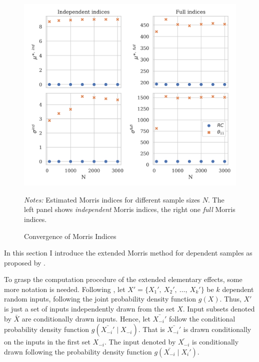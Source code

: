 \begin{figure}[t]
	\caption{Convergence of Morris Indices}
    \label{morris_convergence}
    \begin{centering}
	\vspace*{-4mm}
	\begin{centering}
	\includegraphics[scale=0.9]{../figures/morris_convergence.png}
    \end{centering}
    \end{centering}

    \small
    \textit{Notes:} Estimated Morris indices for different sample sizes $N$. The left panel shows \textit{independent} Morris indices, the right one \textit{full} Morris indices.
\end{figure}

In this section I introduce the extended Morris method for dependent samples as proposed by \citet{GM17}.

To grasp the computation procedure of the extended elementary effects, some more notation is needed. Following \citet{GM17}, let $X' = \{X_1',\ X_2',\ \dots,\ X_k'\}$ be $k$ dependent random inputs, following the joint probability density function $g(X)$. Thus, $X'$ is just a set of inputs independently drawn from the set $X$. Input subsets denoted by $\bar{X}$ are conditionally drawn inputs. Hence, let $\bar{X_{-i}'}$ follow the conditional probability density function $g(\bar{X_{-i}'} \mid X_{-i})$. That is $\bar{X_{-i}'}$ is drawn conditionally on the inputs in the first set $X_{-i}$. The input denoted by $\bar{X_{-i}}$ is conditionally drawn following the probability density function $g(\bar{X_{-i}} \mid X_i')$. %

